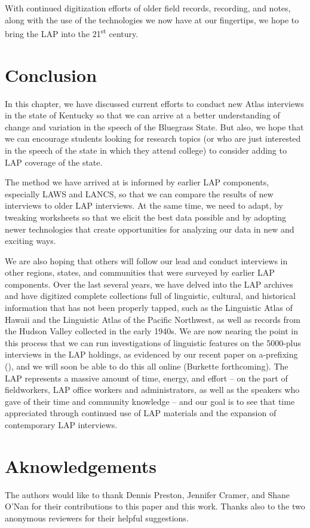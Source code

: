 \documentclass[output=paper]{langscibook}
\begin{document}
With continued digitization efforts of older field records, recording, and notes, along with the use of the technologies we now have at our fingertips, we hope to bring the LAP into the 21\textsuperscript{st} century. 

\section{Conclusion} %
\label{sec:burkette:5}

In this chapter, we have discussed current efforts to conduct new Atlas interviews in the state of Kentucky so that we can arrive at a better understanding of change and variation in the speech of the Bluegrass State. But also, we hope that we can encourage students looking for research topics (or who are just interested in the speech of the state in which they attend college) to consider adding to LAP coverage of the state. 

The method we have arrived at is informed by earlier LAP components, especially LAWS and LANCS, so that we can compare the results of new interviews to older LAP interviews. At the same time, we need to adapt, by tweaking worksheets so that we elicit the best data possible and by adopting newer technologies that create opportunities for analyzing our data in new and exciting ways.

We are also hoping that others will follow our lead and conduct interviews in other regions, states, and communities that were surveyed by earlier LAP components. Over the last several years, we have delved into the LAP archives and have digitized complete collections full of linguistic, cultural, and historical information that has not been properly tapped, such as the Linguistic Atlas of Hawaii and the Linguistic Atlas of the Pacific Northwest, as well as records from the Hudson Valley collected in the early 1940s. We are now nearing the point in this process that we can run investigations of linguistic features on the 5000-plus interviews in the LAP holdings, as evidenced by our recent paper on a-prefixing (\citealt{BurketteAntieau2022}), and we will soon be able to do this all online (Burkette forthcoming). The LAP represents a massive amount of time, energy, and effort -- on the part of fieldworkers, LAP office workers and administrators, as well as the speakers who gave of their time and community knowledge -- and our goal is to see that time appreciated through continued use of LAP materials and the expansion of contemporary LAP interviews.

\section*{Aknowledgements}

The authors would like to thank Dennis Preston, Jennifer Cramer, and Shane O’Nan for their contributions to this paper and this work. Thanks also to the two anonymous reviewers for their helpful suggestions. 

\sloppy\printbibliography[heading=subbibliography,notkeyword=this]
\end{document}
